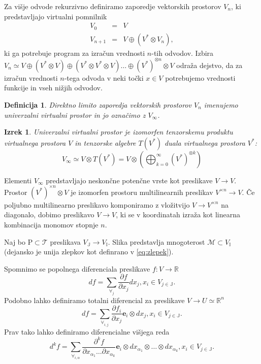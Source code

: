 \documentclass{article}
\newcommand{\RR}{\mathbb{R}}
\newcommand{\II}{\mathbb{I}}
\newcommand{\JJ}{\mathbb{J}}
\newcommand{\T}{\mathcal{T}}
\newcommand{\e}{\mathbf{e}}
\newtheorem{definicija}{Definicija}[section]
\newtheorem{izrek}{Izrek}[section]
\begin{document}
Za višje odvode rekurzivno definiramo zaporedje vektorskih prostorov $V_n$, ki
predstavljajo virtualni pomnilnik
\begin{eqnarray}\label{eq:V_n}
  \label{eq:prapor}
  V_0 &=& V\\
  V_{n+1}&=&V\oplus (V^*\otimes V_n),
\end{eqnarray} 
ki ga potrebuje program za izračun vrednosti $n$-tih odvodov. Izbira $V_n\simeq
V\oplus (V^*\otimes V) \oplus (V^*\otimes V^*\otimes V) \ldots \oplus
(V^*)^{\otimes n}\otimes V$ odraža dejstvo, da za izračun vrednosti $n$-tega odvoda v neki točki $x\in V$
potrebujemo vrednosti funkcije in vseh nižjih odvodov.
\begin{definicija}
  Direktno limito zaporedja vektorskih prostorov $V_n$ imenujemo
  \emph{univerzalni virtualni prostor} in jo označimo z $V_\infty$.
\end{definicija}
\begin{izrek}
  Univerzalni virtualni prostor je izomorfen tenzorskemu produktu virtualnega
  prostora $V$ in tenzorske algebre $T(V^*)$ duala virtualnega prostora $V^*$:
  \begin{equation}
\label{eq:tenzor_algebra}
    V_\infty\simeq V\otimes T(V^*) = V \otimes\left(\bigoplus_{k=0}^\infty (V^*)^{\otimes k} \right)
\end{equation}

\end{izrek}

Elementi $V_\infty$ predstavljajo neskončne potenčne vrste kot preslikave 
$V\to V$. Prostor $(V^*)^{\times n}\otimes V$ je izomorfen prostoru
multilinearnih preslikav $V^{\times n}\to V$. Če poljubno
multilinearno preslikavo komponiramo z vložitvijo $V\to V^{\times n}$ na
diagonalo, dobimo preslikavo $V\to V$, ki se v koordinatah izraža kot linearna
kombinacija monomov stopnje $n$.
   
Naj bo $\mathrm{P}\subset\T$ preslikava $V_\JJ\to V_\II$. Slika predstavlja
mnogoterost $\mathcal{M}\subset V_\II$ (dejansko je unija zlepkov kot definrano
v \ref{eq:zlepek}).


Spomnimo se popolnega diferenciala preslikave $f:V\to \RR$
$$df=\sum_{\forall_j}\frac{\partial f}{\partial x_j}dx_j, x_i\in V_{j\in\JJ}.$$
Podobno lahko definiramo totalni diferencial za preslikave $V\to U\simeq \RR^n$
$$df = \sum_{\forall_{i,j}}\frac{\partial f_i}{\partial x_j}\e_i\otimes dx_j, x_i\in V_{j\in\JJ}.$$
Prav tako lahko definiramo diferencialne višjega reda
$$d^kf=\sum_{\forall_{i,\alpha}}\frac{\partial^k f}{\partial
    x_{\alpha_1}\ldots \partial x_{\alpha_k}}\e_i\otimes
  dx_{\alpha_1}\otimes\ldots \otimes dx_{\alpha_k} , x_i\in V_{j\in\JJ}.$$
\end{document}
